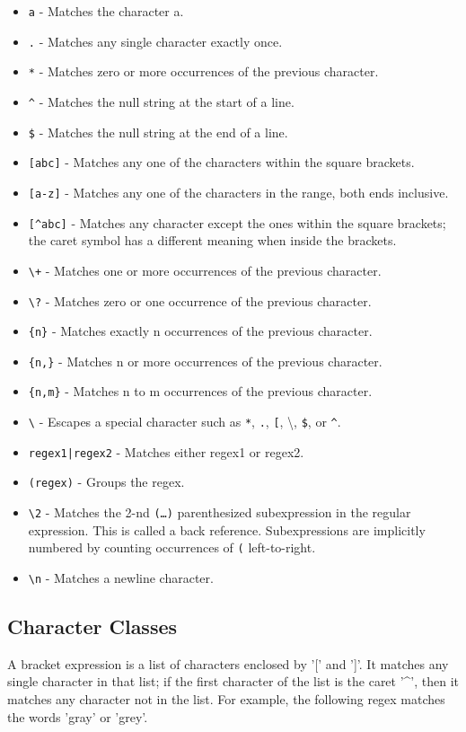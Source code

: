 \begin{itemize}
  \item \texttt{a} - Matches the character a.
  \item \texttt{.} - Matches any single character exactly once.
  \item \texttt{*} - Matches zero or more occurrences of the previous character.
  \item \texttt{\textasciicircum} - Matches the null string at the start of a line.
  \item \texttt{\$} - Matches the null string at the end of a line.
  \item \texttt{[abc]} - Matches any one of the characters within the square brackets.
  \item \texttt{[a-z]} - Matches any one of the characters in the range, both ends inclusive.
  \item \texttt{[\^{}abc]} - Matches any character except the ones within the square brackets; the caret symbol has a different meaning when inside the brackets.
  \item \texttt{\textbackslash+} - Matches one or more occurrences of the previous character.
  \item \texttt{\textbackslash?} - Matches zero or one occurrence of the previous character.
  \item \texttt{\{n\}} - Matches exactly n occurrences of the previous character.
  \item \texttt{\{n,\}} - Matches n or more occurrences of the previous character.
  \item \texttt{\{n,m\}} - Matches n to m occurrences of the previous character.
  \item \texttt{\textbackslash} - Escapes a special character such as \texttt{*}, \texttt{.}, \texttt{[}, \textbackslash{}, \texttt{\$}, or \texttt{\textasciicircum}.
  \item \texttt{regex1|regex2} - Matches either regex1 or regex2.
  \item \texttt{(regex)} - Groups the regex.
    \item \texttt{\textbackslash 2} - Matches the 2-nd \texttt{(…)} parenthesized subexpression in the regular expression. This is called a back reference. Subexpressions are implicitly numbered by counting occurrences of \texttt{(} left-to-right.
  \item \texttt{\textbackslash n} - Matches a newline character.
\end{itemize}

\subsection{Character Classes}
A bracket expression is a list of characters enclosed by '[' and ']'. It matches any single character in that list; if the first character of the list is the caret '\textasciicircum', then it matches any character not in the list.
For example, the following regex matches the words 'gray' or 'grey'.

